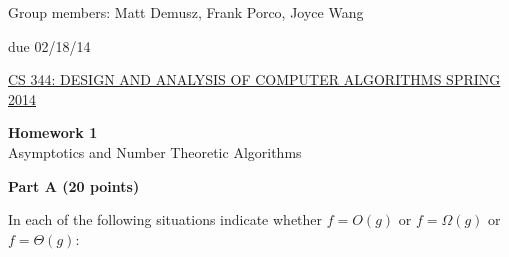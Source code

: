 \documentclass{article}
\begin{document}
\sloppy

\noindent Group members: Matt Demusz, Frank Porco, Joyce Wang

\vspace{0.1in}

\begin{center}
due 02/18/14
\end{center}

\vspace{0.1in}

\noindent \underline{CS 344: DESIGN AND ANALYSIS OF COMPUTER
  ALGORITHMS \hspace{1.6in} SPRING 2014}

\vspace{0.1in}

\begin{center}
{\bf {\large Homework 1}}\\
Asymptotics and Number Theoretic Algorithms\\
\end{center}

\vspace{0.1in}

{\bf }

\begin{center}
{\bf Part A (20 points)}
\end{center}

 In each of the following situations
indicate whether $f=O(g)$ or $f=\Omega(g)$ or $f=\Theta(g)$:
\end{document}

